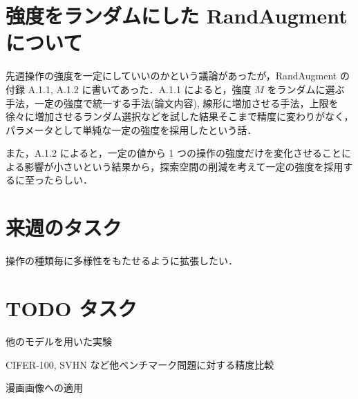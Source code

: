 \documentclass[onecolumn]{ujarticle}   %
\begin{document}
  \section{強度をランダムにした RandAugment について}
  先週操作の強度を一定にしていいのかという議論があったが，RandAugment の付録 A.1.1, A.1.2 に書いてあった．A.1.1 によると，強度 $M$ をランダムに選ぶ手法，一定の強度で統一する手法(論文内容), 線形に増加させる手法，上限を徐々に増加させるランダム選択などを試した結果そこまで精度に変わりがなく，パラメータとして単純な一定の強度を採用したという話．

  また，A.1.2 によると，一定の値から 1 つの操作の強度だけを変化させることによる影響が小さいという結果から，探索空間の削減を考えて一定の強度を採用するに至ったらしい．


	\section{来週のタスク}
	操作の種類毎に多様性をもたせるように拡張したい．

  \section{TODO タスク}
  \begin{itemize}{
    \item{他のモデルを用いた実験}
    \item{CIFER-100, SVHN など他ベンチマーク問題に対する精度比較}
    \item{漫画画像への適用}
	}\end{itemize}

	
	
\end{document}
